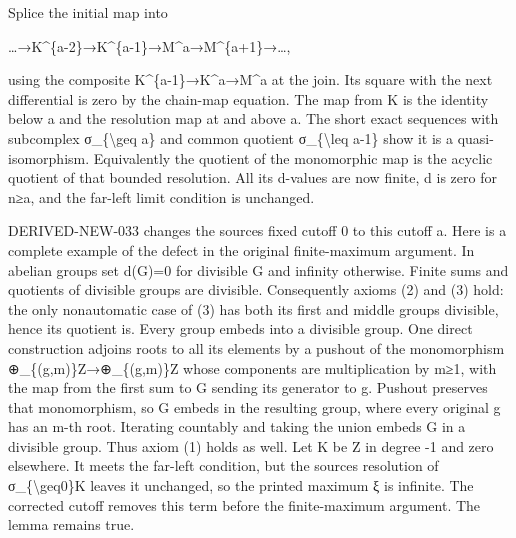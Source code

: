 \documentclass[11pt]{article}
\begin{document}
Splice the initial map into

…\allowbreak{}→K\textasciicircum{}\{a-2\}\allowbreak{}→K\textasciicircum{}\{a-1\}\allowbreak{}→M\textasciicircum{}a\allowbreak{}→M\textasciicircum{}\{a\allowbreak{}+1\}\allowbreak{}→…,\allowbreak{}

using the composite K\textasciicircum{}\{a-1\}\allowbreak{}→K\textasciicircum{}a\allowbreak{}→M\textasciicircum{}a at the join. Its square with the next differential is zero by the chain-map equation. The map from K is the identity below a and the resolution map at and above a. The short exact sequences with subcomplex σ\_\allowbreak{}\{\textbackslash{}geq a\} and common quotient σ\_\allowbreak{}\{\textbackslash{}leq a-1\} show it is a quasi-isomorphism. Equivalently the quotient of the monomorphic map is the acyclic quotient of that bounded resolution. All its d-values are now finite,\allowbreak{} d is zero for n≥a,\allowbreak{} and the far-left limit condition is unchanged.

DERIVED-NEW-033 changes the source\textquotesingle s fixed cutoff 0 to this cutoff a. Here is a complete example of the defect in the original finite-maximum argument. In abelian groups set d(G)\allowbreak{}\allowbreak{}=0 for divisible G and infinity otherwise. Finite sums and quotients of divisible groups are divisible. Consequently axioms (2)\allowbreak{} and (3)\allowbreak{} hold:\allowbreak{} the only nonautomatic case of (3)\allowbreak{} has both its first and middle groups divisible,\allowbreak{} hence its quotient is. Every group embeds into a divisible group. One direct construction adjoins roots to all its elements by a pushout of the monomorphism \allowbreak{}⊕\_\allowbreak{}\{(g,\allowbreak{}m)\allowbreak{}\}Z\allowbreak{}→\allowbreak{}⊕\_\allowbreak{}\{(g,\allowbreak{}m)\allowbreak{}\}Z whose components are multiplication by m≥1,\allowbreak{} with the map from the first sum to G sending its generator to g. Pushout preserves that monomorphism,\allowbreak{} so G embeds in the resulting group,\allowbreak{} where every original g has an m-th root. Iterating countably and taking the union embeds G in a divisible group. Thus axiom (1)\allowbreak{} holds as well. Let K be Z in degree -1 and zero elsewhere. It meets the far-left condition,\allowbreak{} but the source\textquotesingle s resolution of σ\_\allowbreak{}\{\textbackslash{}geq0\}K leaves it unchanged,\allowbreak{} so the printed maximum ξ is infinite. The corrected cutoff removes this term before the finite-maximum argument. The lemma remains true.
\end{document}
